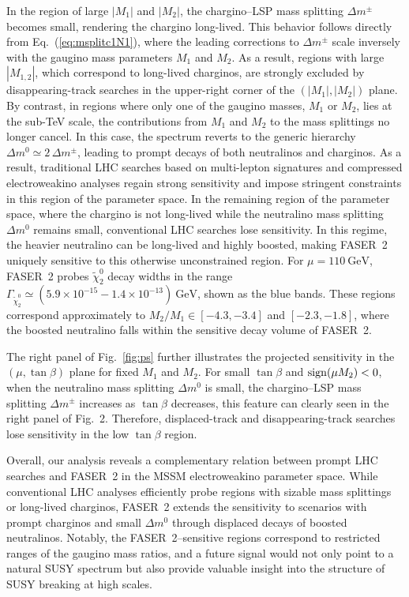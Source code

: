 \documentclass[
    prl,
    twocolumn,
    superscriptaddress,
    nofootinbib,
    amsmath, amssymb,
    aps,
    reprint,
    floatfix
]{revtex4-2}
\begin{document}
In the region of large $|M_1|$ and $|M_2|$, the chargino–LSP mass splitting $\Delta m^\pm$ becomes small, rendering the chargino long-lived. 
This behavior follows directly from Eq.~(\ref{eq:msplitc1N1}), where the leading corrections to $\Delta m^\pm$ scale inversely with the gaugino mass parameters $M_1$ and $M_2$. 
As a result, regions with large $|M_{1,2}|$, which correspond to long-lived charginos, are strongly excluded by disappearing-track searches in the upper-right corner of the $(|M_1|,|M_2|)$ plane. By contrast, in regions where only one of the gaugino masses, $M_1$ or $M_2$, lies at the sub-TeV scale, the contributions from $M_1$ and $M_2$ to the mass splittings no longer cancel. 
In this case, the spectrum reverts to the generic hierarchy $\Delta m^0 \simeq 2\,\Delta m^\pm$, leading to prompt decays of both neutralinos and charginos. 
As a result, traditional LHC searches based on multi-lepton signatures and compressed electroweakino analyses regain strong sensitivity and impose stringent constraints in this region of the parameter space. 
In the remaining region of the parameter space, where the chargino is not long-lived while the neutralino mass splitting $\Delta m^0$ remains small, conventional LHC searches lose sensitivity. In this regime, the heavier neutralino can be long-lived and highly boosted, making FASER~2 uniquely sensitive to this otherwise unconstrained region. For $\mu = 110~\mathrm{GeV}$, FASER~2 probes $\tilde{\chi}_2^0$ decay widths in the range $\Gamma_{\tilde{\chi}_2^0}\simeq (5.9\times10^{-15} - 1.4\times10^{-13})~\mathrm{GeV}$, shown as the blue bands.
These regions correspond approximately to $M_2/M_1 \in [-4.3,-3.4]$ and $[-2.3,-1.8]$, where the boosted neutralino falls within the sensitive decay volume of FASER~2.

The right panel of Fig.~\ref{fig:ps} further illustrates the projected sensitivity in the $(\mu,\tan\beta)$ plane for fixed $M_1$ and $M_2$.
For small $\tan\beta$ and ${\rm sign}(\mu M_2)<0$, when the neutralino mass splitting $\Delta m^0$ is small, the chargino–LSP mass splitting $\Delta m^\pm$ increases as $\tan\beta$ decreases, this feature can clearly seen in the right panel of Fig.~2. Therefore, displaced-track and disappearing-track searches lose sensitivity in the low $\tan{\beta}$ region. 

Overall, our analysis reveals a complementary relation between prompt LHC searches and FASER~2 in the MSSM electroweakino parameter space.
While conventional LHC analyses efficiently probe regions with sizable mass splittings or long-lived charginos, FASER~2 extends the sensitivity to scenarios with prompt charginos and small $\Delta m^0$ through displaced decays of boosted neutralinos.
Notably, the FASER~2–sensitive regions correspond to restricted ranges of the gaugino mass ratios, and a future signal would not only point to a natural SUSY spectrum but also provide valuable insight into the structure of SUSY breaking at high scales.
\end{document}
